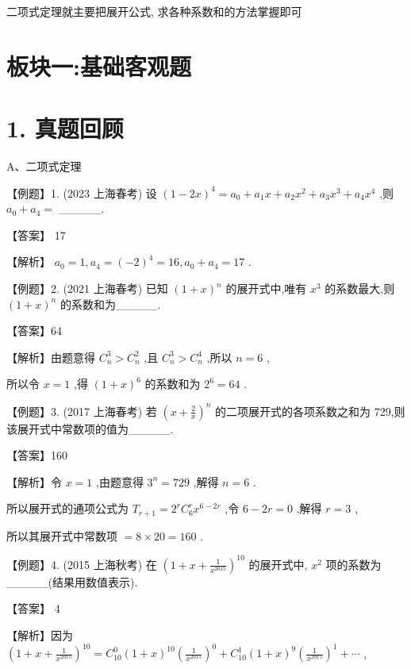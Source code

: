 \documentclass[10pt]{article}
\begin{document}
二项式定理就主要把展开公式, 求各种系数和的方法掌握即可

\section*{板块一:基础客观题}

\section*{1. 真题回顾}

A、二项式定理

【例题】1. (2023 上海春考) 设 \({\left( 1 - 2x\right) }^{4} = {a}_{0} + {a}_{1}x + {a}_{2}{x}^{2} + {a}_{3}{x}^{3} + {a}_{4}{x}^{4}\) ,则 \({a}_{0} + {a}_{4} =\) \_\_\_\_\_.

【答案】 17

【解析】 \({a}_{0} = 1,{a}_{4} = {\left( -2\right) }^{4} = {16},{a}_{0} + {a}_{4} = {17}\) .

【例题】2. (2021 上海春考) 已知 \({\left( 1 + x\right) }^{n}\) 的展开式中,唯有 \({x}^{3}\) 的系数最大,则 \({\left( 1 + x\right) }^{n}\) 的系数和为\_\_\_\_\_.

【答案】64

【解析】由题意得 \({C}_{n}^{3} > {C}_{n}^{2}\) ,且 \({C}_{n}^{3} > {C}_{n}^{4}\) ,所以 \(n = 6\) ,

所以令 \(x = 1\) ,得 \({\left( 1 + x\right) }^{6}\) 的系数和为 \({2}^{6} = {64}\) .

【例题】3. (2017 上海春考) 若 \({\left( x + \frac{2}{x}\right) }^{n}\) 的二项展开式的各项系数之和为 729,则该展开式中常数项的值为\_\_\_\_\_.

【答案】160

【解析】令 \(x = 1\) ,由题意得 \({3}^{n} = {729}\) ,解得 \(n = 6\) .

所以展开式的通项公式为 \({T}_{r + 1} = {2}^{r}{C}_{6}^{r}{x}^{6 - {2r}}\) ,令 \(6 - {2r} = 0\) ,解得 \(r = 3\) ,

所以其展开式中常数项 \(= 8 \times  {20} = {160}\) .

【例题】4. (2015 上海秋考) 在 \({\left( 1 + x + \frac{1}{{x}^{2015}}\right) }^{10}\) 的展开式中, \({x}^{2}\) 项的系数为\_\_\_\_\_(结果用数值表示).

【答案】 4

【解析】因为 \({\left( 1 + x + \frac{1}{{x}^{2015}}\right) }^{10} = {C}_{10}^{0}{\left( 1 + x\right) }^{10}{\left( \frac{1}{{x}^{2015}}\right) }^{0} + {C}_{10}^{1}{\left( 1 + x\right) }^{9}{\left( \frac{1}{{x}^{2015}}\right) }^{1} + \cdots\) ,
\end{document}
